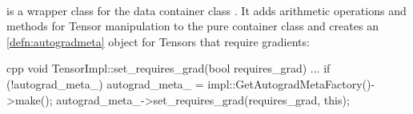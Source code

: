 \begin{defnbox}\nospacing
    \begin{defn}[C10 Tensor]\label{defn:c10_tensor}\leavevmode\\
         is a wrapper class for the data container class .
        It adds arithmetic operations and methods for Tensor manipulation to the pure container class  and creates an \cref{defn:autogradmeta} object for Tensors that require gradients:
        \begin{mintlinebox}{cpp}
            void TensorImpl::set_requires_grad(bool requires_grad) {
            ...
            if (!autograd_meta_)
                autograd_meta_ = impl::GetAutogradMetaFactory()->make();
                autograd_meta_->set_requires_grad(requires_grad, this);
            }
        \end{mintlinebox}
    \end{defn}
\end{defnbox}

